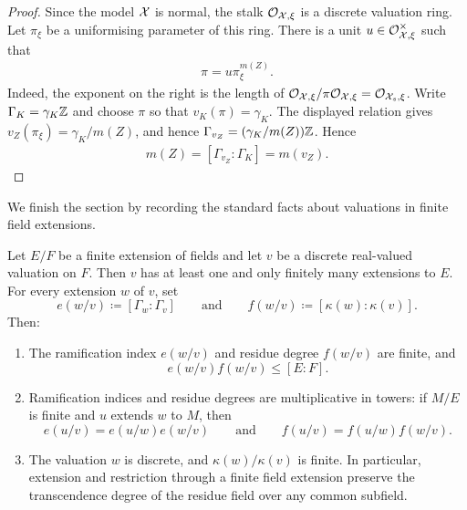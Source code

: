 \begin{proof}
    Since the model $\mathcal X$ is normal, the stalk $\mathcal{O}_{\mathcal X,\xi}$ is a discrete valuation ring.
    Let $\pi_\xi$ be a uniformising parameter of this ring.
    There is a unit
    $u\in\mathcal{O}_{\mathcal X,\xi}^{\times}$ such that
    \begin{align}
        \pi=u\pi_\xi^{m(Z)}.
    \end{align}
    Indeed, the exponent on the right is the length of
    $\mathcal{O}_{\mathcal X,\xi}/\pi\mathcal{O}_{\mathcal X,\xi}=\mathcal{O}_{\mathcal X_s,\xi}$.
    Write $\Gamma_K=\gamma_K\mathbb Z$ and choose $\pi$ so that $v_K(\pi)=\gamma_K$.
    The displayed relation gives
    $v_Z(\pi_\xi)=\gamma_K/m(Z)$, and hence $\Gamma_{v_Z}=(\gamma_K/m(Z))\mathbb Z$.
    Hence
    \begin{align}
        m(Z)=[\Gamma_{v_Z}:\Gamma_K]=m(v_Z).
    \end{align}
\end{proof}

We finish the section by recording the standard facts about valuations in finite field extensions.

\begin{proposition}\label{prop:finite-extension-valued-fields}
    Let $E/F$ be a finite extension of fields and let $v$ be a discrete real-valued valuation on $F$.
    Then $v$ has at least one and only finitely many extensions to $E$.
    For every extension $w$ of $v$, set
    \[
        e(w/v)\coloneqq[\Gamma_w:\Gamma_v]
        \qquad\text{and}\qquad
        f(w/v)\coloneqq[\kappa(w):\kappa(v)].
    \]
    Then:
    \begin{enumerate}[label=\textup{(\roman*)}]
        \item The ramification index $e(w/v)$ and residue degree $f(w/v)$ are finite, and
        \[
            e(w/v)f(w/v)\leq[E:F].
        \]
        \item Ramification indices and residue degrees are multiplicative in towers: if $M/E$ is finite and $u$ extends $w$ to $M$, then
        \[
            e(u/v)=e(u/w)e(w/v)
            \qquad\text{and}\qquad
            f(u/v)=f(u/w)f(w/v).
        \]
        \item The valuation $w$ is discrete, and $\kappa(w)/\kappa(v)$ is finite.
        In particular, extension and restriction through a finite field extension preserve the transcendence degree of the residue field over any common subfield.
    \end{enumerate}
\end{proposition}

